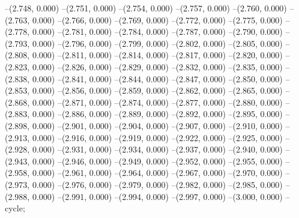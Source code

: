 {--(2.748, 0.000)
--(2.751, 0.000)
--(2.754, 0.000)
--(2.757, 0.000)
--(2.760, 0.000)
--(2.763, 0.000)
--(2.766, 0.000)
--(2.769, 0.000)
--(2.772, 0.000)
--(2.775, 0.000)
--(2.778, 0.000)
--(2.781, 0.000)
--(2.784, 0.000)
--(2.787, 0.000)
--(2.790, 0.000)
--(2.793, 0.000)
--(2.796, 0.000)
--(2.799, 0.000)
--(2.802, 0.000)
--(2.805, 0.000)
--(2.808, 0.000)
--(2.811, 0.000)
--(2.814, 0.000)
--(2.817, 0.000)
--(2.820, 0.000)
--(2.823, 0.000)
--(2.826, 0.000)
--(2.829, 0.000)
--(2.832, 0.000)
--(2.835, 0.000)
--(2.838, 0.000)
--(2.841, 0.000)
--(2.844, 0.000)
--(2.847, 0.000)
--(2.850, 0.000)
--(2.853, 0.000)
--(2.856, 0.000)
--(2.859, 0.000)
--(2.862, 0.000)
--(2.865, 0.000)
--(2.868, 0.000)
--(2.871, 0.000)
--(2.874, 0.000)
--(2.877, 0.000)
--(2.880, 0.000)
--(2.883, 0.000)
--(2.886, 0.000)
--(2.889, 0.000)
--(2.892, 0.000)
--(2.895, 0.000)
--(2.898, 0.000)
--(2.901, 0.000)
--(2.904, 0.000)
--(2.907, 0.000)
--(2.910, 0.000)
--(2.913, 0.000)
--(2.916, 0.000)
--(2.919, 0.000)
--(2.922, 0.000)
--(2.925, 0.000)
--(2.928, 0.000)
--(2.931, 0.000)
--(2.934, 0.000)
--(2.937, 0.000)
--(2.940, 0.000)
--(2.943, 0.000)
--(2.946, 0.000)
--(2.949, 0.000)
--(2.952, 0.000)
--(2.955, 0.000)
--(2.958, 0.000)
--(2.961, 0.000)
--(2.964, 0.000)
--(2.967, 0.000)
--(2.970, 0.000)
--(2.973, 0.000)
--(2.976, 0.000)
--(2.979, 0.000)
--(2.982, 0.000)
--(2.985, 0.000)
--(2.988, 0.000)
--(2.991, 0.000)
--(2.994, 0.000)
--(2.997, 0.000)
--(3.000, 0.000)
--cycle;
}
